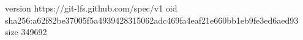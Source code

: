 version https://git-lfs.github.com/spec/v1
oid sha256:a62f82be37005f5a4939428315062adc469fa4eaf21e660bb1eb9fe3ed6aed93
size 349692
